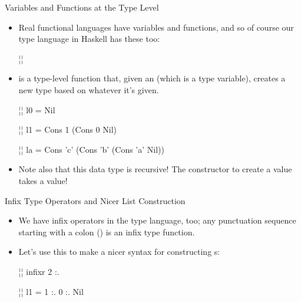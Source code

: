 \documentclass[xcolor=dvipsnames]{beamer}          %
\newcommand{\lT}[1]{\color{Fuchsia}{#1}}        %
\begin{document}
\begin{frame}[fragile]{Variables and Functions at the Type Level}
\begin{itemize}
    \item Real functional languages have variables and functions, and
        so of course our type language in Haskell has these too:
        \begin{hlisting}
            ¦\lT{data List a = Cons a (List a) | Nil}¦
        \end{hlisting}
    \item {} is a type-level function that, given an  (which
        is a type variable), creates a new type based on whatever 
        it's given.
        \begin{hlisting}
            ¦\lT{l0 :: List Int}¦
            l0 = Nil

            ¦\lT{l1 :: List Int}¦
            l1 = Cons 1 (Cons 0 Nil)

            ¦\lT{la :: List Char}¦
            la = Cons 'c' (Cons 'b' (Cons 'a' Nil))
        \end{hlisting}
    \item Note also that this data type is recursive! The 
        constructor to create a  value takes a  value!
\end{itemize}
\end{frame}


\begin{frame}[fragile]{Infix Type Operators and Nicer List Construction}
\begin{itemize}
    \item We have infix operators in the type language, too; any
        punctuation sequence starting with a colon (\T{:}) is an
        infix type function.
    \item Let's use this to make a nicer syntax for constructing s:
        \begin{hlisting}
            ¦\lT{data List a = a :. (List a) | Nil}¦
            infixr 2 :.

            ¦\lT{l1 :: List Int}¦
            l1 = 1 :. 0 :. Nil
        \end{hlisting}
\end{itemize}
\end{frame}
\end{document}
